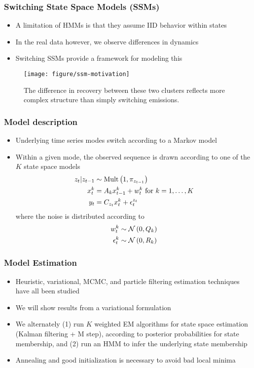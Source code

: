 \documentclass{beamer}
\begin{document}
\begin{frame}
  \frametitle{Switching State Space Models (SSMs)}
 \begin{itemize}
 \item A limitation of HMMs is that they assume IID behavior within states
 \item In the real data however, we observe differences in dynamics
 \item Switching SSMs provide a framework for modeling this \citep{ghahramani2000variational}
 \end{itemize} 

\begin{figure}[ht]
  \centering
  \texttt{[image: figure/ssm-motivation]}
  \caption{The difference in recovery between these two clusters reflects more
    complex structure than simply switching
    emissions. \label{fig:ssm-motivation}}
\end{figure}

\end{frame}

\begin{frame}
  \frametitle{Model description}
\begin{itemize}
\item Underlying time series modes switch according to a Markov model
\item Within a given mode, the observed sequence is drawn according to one of
  the $K$ state space models
  \begin{align*}
    z_{t} \vert z_{t - 1} &\sim \textnormal{Mult}\left(1, \pi_{z_{t - 1}}\right) \\
    x^{k}_{t} &= A_{k}x_{t - 1}^{k} + w^{k}_{t} \text{ for }k = 1, \dots, K\\
    y_{t} &= C_{z_{t}}x_{t}^{k} + \epsilon_{t}^{z_{t}}
    \end{align*}
  where the noise is distributed according to
  \begin{align*}
    w^{k}_{t} &\sim \mathcal{N}\left(0, Q_{k}\right) \\
    \epsilon^{k}_{t} &\sim \mathcal{N}\left(0, R_{k}\right)
  \end{align*}
\end{itemize}
\end{frame}

\begin{frame}
  \frametitle{Model Estimation}
  \begin{itemize}
  \item Heuristic, variational, MCMC, and particle filtering estimation
    techniques have all been studied \citep{harrison1976bayesian, ghahramani2000variational, fruhwirth2001markov, doucet2001particle}
  \item We will show results from a variational formulation
  \item We alternately (1) run $K$ weighted EM algorithms for state space
    estimation (Kalman filtering + M step), according to posterior probabilities
    for state membership, and (2) run an HMM to infer the underlying state
    membership
  \item Annealing and good initialization is necessary to avoid bad local minima
  \end{itemize}
\end{frame}
\end{document}
